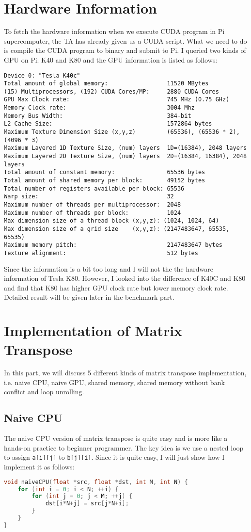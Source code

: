 \documentclass{article}
\begin{document}
\section{Hardware Information}
To fetch the hardware information when we execute CUDA program in Pi supercomputer, the TA has already given us a CUDA script. What we need to do is compile the CUDA program to binary and submit to Pi. I queried two kinds of GPU on Pi: K40 and K80 and the GPU information is listed as follows:
\begin{verbatim}
Device 0: "Tesla K40c"
Total amount of global memory:                 11520 MBytes
(15) Multiprocessors, (192) CUDA Cores/MP:     2880 CUDA Cores
GPU Max Clock rate:                            745 MHz (0.75 GHz)
Memory Clock rate:                             3004 Mhz
Memory Bus Width:                              384-bit
L2 Cache Size:                                 1572864 bytes
Maximum Texture Dimension Size (x,y,z)         (65536), (65536 * 2), (4096 * 3)
Maximum Layered 1D Texture Size, (num) layers  1D=(16384), 2048 layers
Maximum Layered 2D Texture Size, (num) layers  2D=(16384, 16384), 2048 layers
Total amount of constant memory:               65536 bytes
Total amount of shared memory per block:       49152 bytes
Total number of registers available per block: 65536
Warp size:                                     32
Maximum number of threads per multiprocessor:  2048
Maximum number of threads per block:           1024
Max dimension size of a thread block (x,y,z): (1024, 1024, 64)
Max dimension size of a grid size    (x,y,z): (2147483647, 65535, 65535)
Maximum memory pitch:                          2147483647 bytes
Texture alignment:                             512 bytes
\end{verbatim}
Since the information is a bit too long and I will not the the hardware information of Tesla K80. However, I looked into the difference of K40C and K80 and find that K80 has higher GPU clock rate but lower memory clock rate. Detailed result will be given later in the benchmark part.

\section{Implementation of Matrix Transpose}
In this part, we will discuss 5 different kinds of matrix transpose implementation, i.e. naive CPU, naive GPU, shared memory, shared memory without bank conflict and loop unrolling.
\subsection{Naive CPU}
The naive CPU version of matrix transpose is quite easy and is more like a hands-on practice to beginner programmer. The key idea is we use a nested loop to assign \verb|a[i][j]| to \verb|b[j][i]|. Since it is quite easy, I will just show how I implement it as follows:
\begin{lstlisting}[language=C, caption=naive CPU]
void naiveCPU(float *src, float *dst, int M, int N) {   
    for (int i = 0; i < N; ++i) {
        for (int j = 0; j < M; ++j) {
	        dst[i*N+j] = src[j*N+i];
        }
    }
}
\end{lstlisting}
\end{document}
